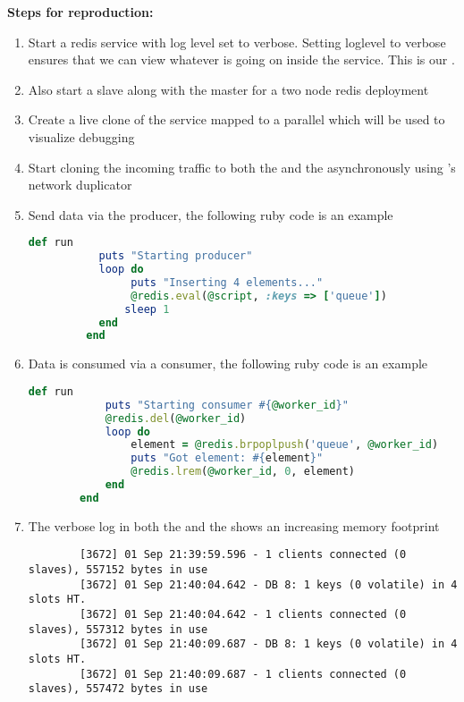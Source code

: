 \noindent \textbf{Steps for reproduction:} \\

\begin{adjustwidth}{0.5cm}{}
	\begin{enumerate}
		\item Start a redis service with log level set to verbose. Setting loglevel to verbose ensures that we can view whatever is going on inside the service. This is our \productioncontainer.
		\item Also start a slave along with the master for a two node redis deployment
		\item Create a live clone of the service mapped to a parallel \debugcontainer which will be used to visualize debugging
		\item Start cloning the incoming traffic to both the \productioncontainer and the \debugcontainer asynchronously using \parikshan's network duplicator
		
		\item Send data via the producer, the following ruby code is an example
		
		\begin{lstlisting}[language=ruby]
		def run
		   puts "Starting producer"
		   loop do
		        puts "Inserting 4 elements..."
		        @redis.eval(@script, :keys => ['queue'])
	           sleep 1
		   end
		 end
		\end{lstlisting}
		
		\item Data is consumed via a consumer, the following ruby code is an example
		
		\begin{lstlisting}[language=ruby]
		def run
			puts "Starting consumer #{@worker_id}"
			@redis.del(@worker_id)
			loop do
				element = @redis.brpoplpush('queue', @worker_id)
				puts "Got element: #{element}"
				@redis.lrem(@worker_id, 0, element)
			end
		end		
		\end{lstlisting}
		
		\item The verbose log in both the \productioncontainer and the \debugcontainer shows an increasing memory footprint
		
		\begin{lstlisting}
		[3672] 01 Sep 21:39:59.596 - 1 clients connected (0 slaves), 557152 bytes in use
		[3672] 01 Sep 21:40:04.642 - DB 8: 1 keys (0 volatile) in 4 slots HT.
		[3672] 01 Sep 21:40:04.642 - 1 clients connected (0 slaves), 557312 bytes in use
		[3672] 01 Sep 21:40:09.687 - DB 8: 1 keys (0 volatile) in 4 slots HT.
		[3672] 01 Sep 21:40:09.687 - 1 clients connected (0 slaves), 557472 bytes in use
		\end{lstlisting}
		
	\end{enumerate}
\end{adjustwidth}

